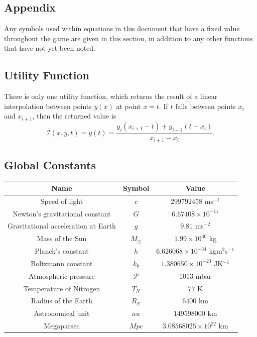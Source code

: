 \documentclass{article}
\begin{document}
\clearpage
\begin{appendix}
\section{Appendix}
Any symbols used within equations in this document that have a fixed value throughout the game are given in this section, in addition to any other functions that have not yet been noted.
\subsection{Utility Function}
There is only one utility function, which returns the result of a linear interpolation between points $y(x)$ at point $x = t$. If $t$ falls between points $x_i$ and $x_{i+1}$, then the returned value is
\begin{equation}
    \mathcal{I}(x, y, t) = y(t) = \frac{y_i(x_{i+1} - t) + y_{i+1}(t - x_i)}{x_{i+1} - x_i}.
    \label{eq:lerp}
\end{equation}
\subsection{Global Constants}
\label{sec:constants}
\begin{center}
    \begin{tabular}{ |c|c|c| } 
     \hline
     \textbf{Name} & \textbf{Symbol}  & \textbf{Value}\\     
     \hline
     Speed of light  & $c$ & $299792458$ ms$^{-1}$\\ 
     \hline
     Newton's gravitational constant  & $G$ & $6.67408 \times 10^{-11}$\\ 
     \hline
     Gravitational acceleration at Earth  & $g$ & $9.81$ ms$^{-2}$\\ 
     \hline
     Mass of the Sun  & $M_{\odot}$ & $1.99 \times 10^{30}$ kg\\ 
     \hline
     Planck's constant  & $h$  & $6.626068 \times 10^{-34}$ kgm$^2$s$^{-1}$\\ 
     \hline
    Boltzmann constant  & $k_b$  & $1.380650 \times 10^{-23}$ JK$^{-1}$\\ 
    \hline
    Atmospheric pressure  & $\mathcal{P}$  & $1013$ mbar\\ 
    \hline
    Temperature of Nitrogen  & $T_N$  & $77$ K\\ 
    \hline
    Radius of the Earth & $R_E$ &  $6400$ km\\ 
    \hline
    Astronomical unit & $au$ &  $149598000$ km\\ 
    \hline
    Megaparsec & $Mpc$ & $3.08568025 \times 10^{22}$ km\\ 
    \hline
    \end{tabular}
\end{center}

\end{appendix}
\end{document}
